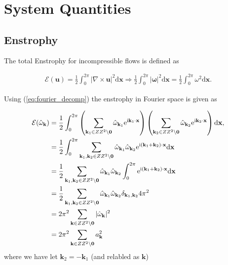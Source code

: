 \documentclass[9pt]{article}
\newcommand{\ii}{\mathrm{i}}      								  %
\newcommand{\e}{\mathrm{e}}      								  %
\newcommand{\curl}[1]{\nabla \times {#1}}								%
\newcommand{\bfu}{\mathbf{u}}											%
\newcommand{\omegahat}[1]{\hat{\omega}_{ \mathbf{#1} } }								%
\newcommand{\bfx}{\mathbf{x}}								%
\newcommand{\bfk}{\mathbf{k}}								%
\newcommand{\bfkn}[1]{\mathbf{k}_{#1}}								%
\begin{document}
\section{System Quantities}

\subsection{Enstrophy}

The total Enstrophy for incompressible flows is defined as 

\begin{align}
	\mathcal{E}(\bfu) = \frac{1}{2}\int_{0}^{2\pi} |\curl{\bfu}|^2 \mathrm{d}\bfx \Rightarrow \frac{1}{2}\int_{0}^{2\pi} |\bm{\omega}|^2 \mathrm{d}\bfx = \frac{1}{2}\int_{0}^{2\pi} \omega^2 \mathrm{d}\bfx .
	\label{eq:enstrophy_def}
\end{align}

Using (\ref{eq:fourier_decomp}) the enstrophy in Fourier space is given as 

\begin{align}
	\mathcal{E}(\omegahat{k}) &= \frac{1}{2}\int_{0}^{2\pi} \left(\sum_{\mathbf{k}_1\in \mathbb{Z}^2\setminus \mathbf{0}}\hat{\omega}_{\mathbf{k}_1}\e^{\ii \mathbf{k}_1\cdot \mathbf{x}}\right)\left(\sum_{\mathbf{k}_2\in \mathbb{Z}^2\setminus \mathbf{0}}\hat{\omega}_{\mathbf{k}_2}\e^{\ii \mathbf{k}_2\cdot \mathbf{x}}\right)  \mathrm{d}\bfx, \notag \\
	&= \frac{1}{2}\int_{0}^{2\pi}\sum_{\mathbf{k}_1, \bfkn{2}\in \mathbb{Z}^2\setminus \mathbf{0}}\hat{\omega}_{\mathbf{k}_1}\hat{\omega}_{\mathbf{k}_2} \e^{\ii \left(\mathbf{k}_1 + \bfkn{2}\right)\cdot \mathbf{x}}\mathrm{d}\bfx \notag \\
	&=\frac{1}{2}\sum_{\mathbf{k}_1, \bfkn{2}\in \mathbb{Z}^2\setminus \mathbf{0}}\hat{\omega}_{\mathbf{k}_1}\hat{\omega}_{\mathbf{k}_2} \int_{0}^{2\pi} \e^{\ii \left(\mathbf{k}_1 + \bfkn{2}\right)\cdot \mathbf{x}}\mathrm{d}\bfx \notag \\
	&= \frac{1}{2}\sum_{\mathbf{k}_1, \bfkn{2}\in \mathbb{Z}^2\setminus \mathbf{0}}\hat{\omega}_{\mathbf{k}_1}\hat{\omega}_{\mathbf{k}_2} \delta_{\bfkn{1}, \bfkn{2}} 4 \pi^2 \notag \\
	&= 2 \pi^2 \sum_{\mathbf{k}\in \mathbb{Z}^2\setminus \mathbf{0}}|\hat{\omega}_{\mathbf{k}} |^2 \notag \\
	&= 2 \pi^2 \sum_{\mathbf{k}\in \mathbb{Z}^2\setminus \mathbf{0}} a_{\bfk}^2
	\label{eq:enstrophy_fourier}
\end{align}
where we have let $\bfkn{2} = - \bfkn{1}$ (and relabled as $\bfk$)
\end{document}
